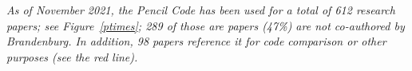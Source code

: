 \documentclass[12pt]{article}
\begin{document}
{\em
As of November 2021, the {\sc Pencil Code} has been used for a total of
612 research papers; see Figure~\ref{ptimes};
289 of those are papers (47\%) are not co-authored by Brandenburg. %
In addition, 98 papers reference it for code comparison or other purposes %
(see the red line).
}
%
\end{document}
